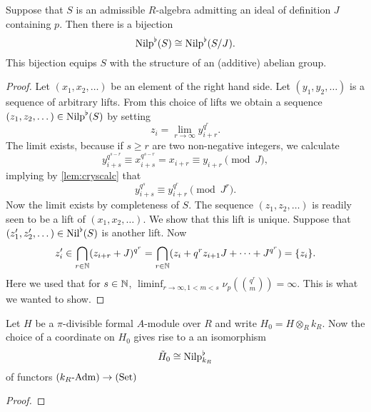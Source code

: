 \documentclass[../main.tex]{subfiles}
\begin{document}
\begin{lem} \label{lem:crysnilp}
  Suppose that $S$ is an admissible $R$-algebra admitting an ideal of
  definition $J$ containing $p$. Then there is a bijection
  \begin{equation*}
    {\mathrm{Nilp}}^\flat(S) \cong {\mathrm{Nilp}}^\flat(S/J).
  \end{equation*}
  This bijection equips $S$ with the structure of an (additive) abelian group. 
  \begin{proof}[Proof]
    Let $(x_1, x_2, \dots)$ be an element of the right hand side. Let
    $(y_1, y_2, \dots)$ is a sequence of arbitrary lifts. From this choice of lifts
    we obtain a sequence
    $(z_1, z_2, \dots) \in {\mathrm{Nilp}}^\flat(S)$ by setting
    \begin{equation*}
      z_i = \lim_{r \to \infty} y_{i+r}^{q^r}.
    \end{equation*}
    The limit exists, because if $s \geq r$ are two non-negative integers, we calculate
    \begin{equation*}
      y_{i + s}^{q^{s-r}} \equiv x_{i+s}^{q^{s-r}} = x_{i+r} \equiv y_{i+r} \pmod J,
    \end{equation*}
    implying by \ref{lem:cryscalc} that 
    \begin{equation*}
      y_{i+s}^{q^s} \equiv y_{i+r}^{q^r} \pmod {J^r}.
    \end{equation*}
    Now the limit exists by completeness of $S$.
    The sequence $(z_1, z_2, \dots)$  is readily seen to be a lift of 
    $(x_1, x_2, \dots)$. We show that this lift is unique. Suppose that 
    $(z'_1, z'_2, \dots) \in {\operatorname{Nil}}^\flat(S)$ is another lift. Now 
    \begin{equation*}
      z'_i \in \bigcap_{r \in \mathbb{N}}(z_{i+r} + J)^{q^r} = \bigcap_{r \in \mathbb{N}}(z_{i} +
      q^r z_{i+1} J + \dots + J^{q^r})=  \{z_i\}.
    \end{equation*}
  Here we used that for $s \in \mathbb{N}$, $\liminf_{r \to \infty, 1<m<s} \nu_p\left( \binom
    {q^r}{m} \right) = \infty$. This is what we wanted to show.
  \end{proof}
\end{lem}

\begin{lem}
  Let $H$ be a $\pi$-divisible formal $A$-module over $R$ and write $H_0 = H
  \otimes_R k_R$. Now the choice of a coordinate on $H_0$ gives rise to a
  an isomorphism 
  \begin{equation*}
    \tilde H_0 \cong {\mathrm{Nilp}}^\flat_{k_R}
  \end{equation*}
  of functors ${({k_R}\text-\mathrm{Adm})} \to {(\mathrm{Set})}$
\begin{proof}
  \end{proof}
\end{lem}
\end{document}
